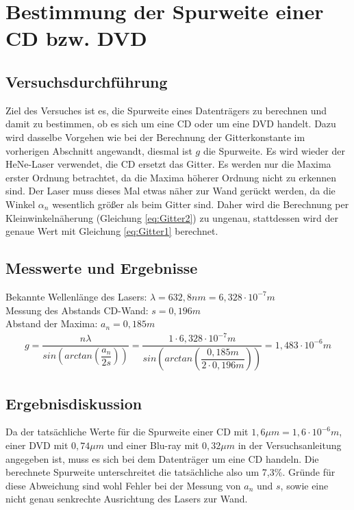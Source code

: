 \documentclass{scrartcl}
\begin{document}
\section{Bestimmung der Spurweite einer CD bzw. DVD}
\subsection{Versuchsdurchführung}
Ziel des Versuches ist es, die Spurweite eines Datenträgers zu berechnen und damit zu bestimmen, ob es sich um eine CD oder um eine DVD handelt. Dazu wird dasselbe Vorgehen wie bei der Berechnung der Gitterkonstante im vorherigen Abschnitt angewandt, diesmal ist $g$ die Spurweite. Es wird wieder der HeNe-Laser verwendet, die CD ersetzt das Gitter. Es werden nur die Maxima erster Ordnung betrachtet, da die Maxima höherer Ordnung nicht zu erkennen sind. Der Laser muss dieses Mal etwas näher zur Wand gerückt werden, da die Winkel $\alpha_{n}$ wesentlich größer als beim Gitter sind. Daher wird die Berechnung per Kleinwinkelnäherung (Gleichung \ref{eq:Gitter2}) zu ungenau, stattdessen wird der genaue Wert mit Gleichung \ref{eq:Gitter1} berechnet.
\subsection{Messwerte und Ergebnisse}
Bekannte Wellenlänge des Lasers: $\lambda = 632,8nm = 6,328 \cdot 10^{-7}m$ \\
Messung des Abstands CD-Wand: $s = 0,196m$ \\
Abstand der Maxima: $a_{n} = 0,185m$
\begin{align*}
g = \dfrac{n \lambda}{sin \left( arctan \left( \dfrac{a_{n}}{2s} \right) \right) } = \dfrac{1 \cdot 6,328 \cdot 10^{-7}m}{sin \left( arctan \left( \dfrac{0,185m}{2 \cdot 0,196m} \right) \right) } = 1,483 \cdot 10^{-6}m
\end{align*}
\subsection{Ergebnisdiskussion}
Da der tatsächliche Werte für die Spurweite einer CD mit $1,6 \mu m = 1,6 \cdot 10^{-6}m$, einer DVD mit $0,74 \mu m$ und einer Blu-ray mit $0,32 \mu m$ in der Versuchsanleitung angegeben ist, muss es sich bei dem Datenträger um eine CD handeln. Die berechnete Spurweite unterschreitet die tatsächliche also um 7,3\%. Gründe für diese Abweichung sind wohl Fehler bei der Messung von $a_{n}$ und $s$, sowie eine nicht genau senkrechte Ausrichtung des Lasers zur Wand.
\end{document}
